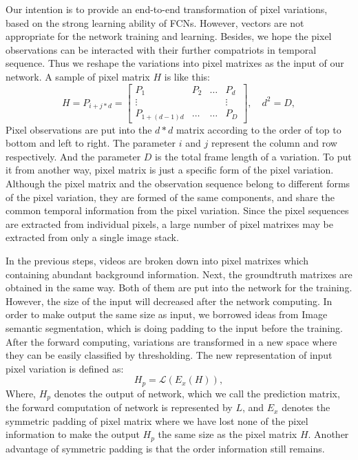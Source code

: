 \documentclass[journal]{IEEEtran}
\begin{document}
Our intention is to provide an end-to-end transformation of pixel variations, based on the strong learning ability of FCNs. 
However, vectors are not appropriate for the network training and learning. 
Besides, we hope the pixel observations can be interacted with their further compatriots in temporal sequence. 
Thus we reshape the variations into pixel matrixes as the input of our network. 
A sample of pixel matrix $H$ is like this:
\begin{equation}
H=P_{i+j*d}=\begin{bmatrix}
 P_1& P_2  &\dots  &P_d \\ 
\vdots &  &  &\vdots \\ 
 P_{1+(d-1)d}& \dots & \dots & P_D
\end{bmatrix},\quad d^2=D,
\end{equation}
Pixel observations are put into the $d*d$ matrix according to the order of top to bottom and left to right. 
The parameter $i$ and $j$ represent the column and row respectively. 
And the parameter $D$ is the total frame length of a variation. 
To put it from another way, pixel matrix is just a specific form of the pixel variation. 
Although the pixel matrix and the observation sequence belong to different forms of the pixel variation, they are formed of the same components, and share the common temporal information from the pixel variation. 
Since the pixel sequences are extracted from individual pixels, a large number of pixel matrixes may be extracted from only a single image stack.

In the previous steps, videos are broken down into pixel matrixes which containing abundant background information. 
Next, the groundtruth matrixes are obtained in the same way. 
Both of them are put into the network for the training. 
However, the size of the input will decreased after the network computing. 
In order to make output the same size as input, we borrowed ideas from Image semantic segmentation, which is doing padding to the input before the training. 
After the forward computing, variations are transformed in a new space where they can be easily classified by thresholding. 
The new representation of input pixel variation is defined as:
\begin{equation}
H_p= \mathcal L (E_x (H)),
\end{equation}
Where, $H_p$ denotes the output of network, which we call the prediction matrix, the forward computation of network is represented by $L$, and $E_x$ denotes the symmetric padding of pixel matrix where we have lost none of the pixel information to make the output $H_p$ the same size as the pixel matrix $H$. 
Another advantage of symmetric padding is that the order information still remains.
\end{document}
